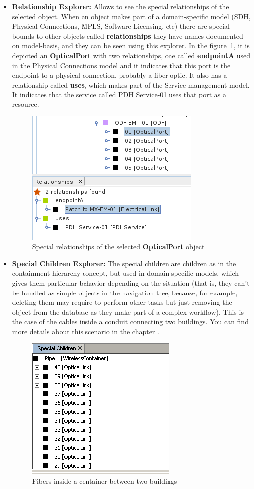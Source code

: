 \documentclass[a4paper]{article}
\begin{document}
	\begin{itemize}
		\item \textbf{Relationship Explorer:} Allows to see the special relationships of the selected object. When an object makes part of a domain-specific model (SDH, Physical Connections, MPLS, Software Licensing, etc) there are special bounds to other objects called \textbf{relationships} they have names documented on model-basis, and they can be seen using this explorer. In the figure~\ref{fig:navigation_tree_relationship_explorer}, it is depicted an \textbf{OpticalPort} with two relationships, one called \textbf{endpointA} used in the Physical Connections model and it indicates that this port is the endpoint to a physical connection, probably a fiber optic. It also has a relationship called \textbf{uses}, which makes part of the Service management model. It indicates that the service called PDH Service-01 uses that port as a resource.
			\begin{figure}[h!]
				\centering
				\includegraphics[width=0.4\linewidth]{img/navigation_tree_relationship_explorer.png}
				\caption{Special relationships of the selected \textbf{OpticalPort} object}
				\label{fig:navigation_tree_relationship_explorer}
			\end{figure}
		\item \textbf{Special Children Explorer:} The special children are children as in the containment hierarchy concept, but used in domain-specific models, which gives them particular behavior depending on the situation (that is, they can't be handled as simple objects in the navigation tree, because, for example, deleting them may require to perform other tasks but just removing the object from the database as they make part of a complex workflow). This is the case of the cables inside a conduit connecting two buildings. You can find more details about this scenario in the chapter \textbf{}.
			\begin{figure}[h!]
				\centering
				\includegraphics[width=0.3\linewidth]{img/navigation_tree_special_children_explorer.png}
				\caption{Fibers inside a container between two buildings}
				\label{fig:navigation_tree_special_children_explorer}
			\end{figure}
	\end{itemize}
	
\end{document}
